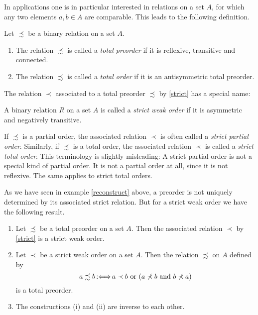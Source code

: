 ﻿\documentclass[a4paper,11pt,final]{article}
\newcommand{\defby}{\mbox{\ensuremath{\,:\Longleftrightarrow\,}}\xspace}
\numberwithin{equation}{subsection}
\begin{document}
In applications one is in particular interested in relations on a set $A$, for which any two elements $a,b\in A$ are comparable. This leads to the following definition.
\begin{defi}
Let $\precsim$ be a binary relation on a set $A$.
\begin{enumerate}
\item The relation $\precsim$ is called a \emph{total preorder} if it is reflexive, transitive and connected.
\item The relation $\precsim$ is called a \emph{total order} if it is an antisymmetric total preorder.
\end{enumerate}
\end{defi}

The relation $\prec$ associated to a total preorder $\precsim$ by \ref{strict} has a special name:
\begin{defi}
A binary relation $R$ on a set $A$ is called a \emph{strict weak order} if it is asymmetric and negatively transitive.
\end{defi}

\begin{rem}
If $\precsim$ is a partial order, the associated relation $\prec$ is often called a \emph{strict partial order}. Similarly, if $\precsim$ is a total order, the associated relation $\prec$ is called a \emph{strict total order}. This terminology is slightly misleading: A strict partial order is not a special kind of partial order. It is not a partial order at all, since it is not reflexive. The same applies to strict total orders.
\end{rem}

As we have seen in example \ref{reconstruct} above, a preorder is not uniquely determined by its associated strict relation. But for a strict weak order we have the following result.
\begin{prop}
\begin{enumerate}
\item Let $\precsim$ be a total preorder on a set $A$. Then the associated relation $\prec$ by \ref{strict} is a strict weak order.
\item Let $\prec$ be a strict weak order on a set $A$. Then the relation $\precsim$ on $A$ defined by
\begin{equation*}
a \precsim b\defby a \prec b \text{ or } (a\nprec b\text{ and } b\nprec a)
\end{equation*}
is a total preorder.
\item The constructions (i) and (ii) are inverse to each other.
\end{enumerate}
\end{prop}
\end{document}
